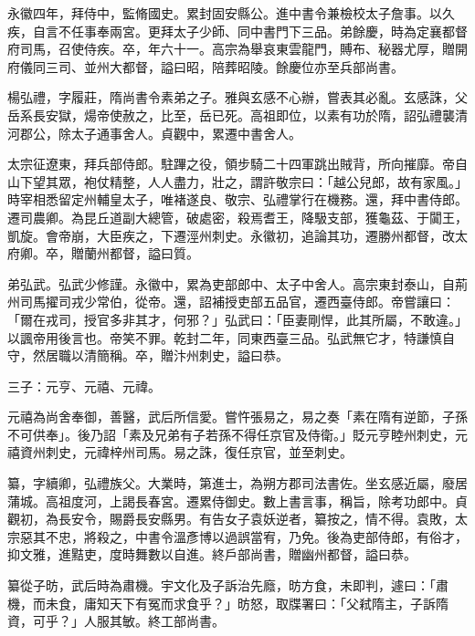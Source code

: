 \begin{pinyinscope}
 永徽四年，拜侍中，監脩國史。累封固安縣公。進中書令兼檢校太子詹事。以久疾，自言不任事奉兩宮。更拜太子少師、同中書門下三品。弟餘慶，時為定襄都督府司馬，召使侍疾。卒，年六十一。高宗為舉哀東雲龍門，賻布、秘器尤厚，贈開府儀同三司、並州大都督，謚曰昭，陪葬昭陵。餘慶位亦至兵部尚書。



 楊弘禮，字履莊，隋尚書令素弟之子。雅與玄感不心辦，嘗表其必亂。玄感誅，父岳系長安獄，煬帝使赦之，比至，岳已死。高祖即位，以素有功於隋，詔弘禮襲清河郡公，除太子通事舍人。貞觀中，累遷中書舍人。



 太宗征遼東，拜兵部侍郎。駐蹕之役，領步騎二十四軍跳出賊背，所向摧靡。帝自山下望其眾，袍仗精整，人人盡力，壯之，謂許敬宗曰：「越公兒郎，故有家風。」時宰相悉留定州輔皇太子，唯褚遂良、敬宗、弘禮掌行在機務。還，拜中書侍郎。遷司農卿。為昆丘道副大總管，破處密，殺焉耆王，降馺支部，獲龜茲、于闐王，凱旋。會帝崩，大臣疾之，下遷涇州刺史。永徽初，追論其功，遷勝州都督，改太府卿。卒，贈蘭州都督，謚曰質。



 弟弘武。弘武少修謹。永徽中，累為吏部郎中、太子中舍人。高宗東封泰山，自荊州司馬擢司戎少常伯，從帝。還，詔補授吏部五品官，遷西臺侍郎。帝嘗讓曰：「爾在戎司，授官多非其才，何邪？」弘武曰：「臣妻剛悍，此其所屬，不敢違。」以諷帝用後言也。帝笑不罪。乾封二年，同東西臺三品。弘武無它才，特謙慎自守，然居職以清簡稱。卒，贈汴州刺史，謚曰恭。



 三子：元亨、元禧、元禕。



 元禧為尚舍奉御，善醫，武后所信愛。嘗忤張易之，易之奏「素在隋有逆節，子孫不可供奉」。後乃詔「素及兄弟有子若孫不得任京官及侍衛。」貶元亨睦州刺史，元禧資州刺史，元禕梓州司馬。易之誅，復任京官，並至刺史。



 纂，字續卿，弘禮族父。大業時，第進士，為朔方郡司法書佐。坐玄感近屬，廢居蒲城。高祖度河，上謁長春宮。遷累侍御史。數上書言事，稱旨，除考功郎中。貞觀初，為長安令，賜爵長安縣男。有告女子袁妖逆者，纂按之，情不得。袁敗，太宗惡其不忠，將殺之，中書令溫彥博以過誤當宥，乃免。後為吏部侍郎，有俗才，抑文雅，進黠吏，度時舞數以自進。終戶部尚書，贈幽州都督，謚曰恭。



 纂從子昉，武后時為肅機。宇文化及子訴治先廕，昉方食，未即判，遽曰：「肅機，而未食，庸知天下有冤而求食乎？」昉怒，取牒署曰：「父弒隋主，子訴隋資，可乎？」人服其敏。終工部尚書。




\end{pinyinscope}
